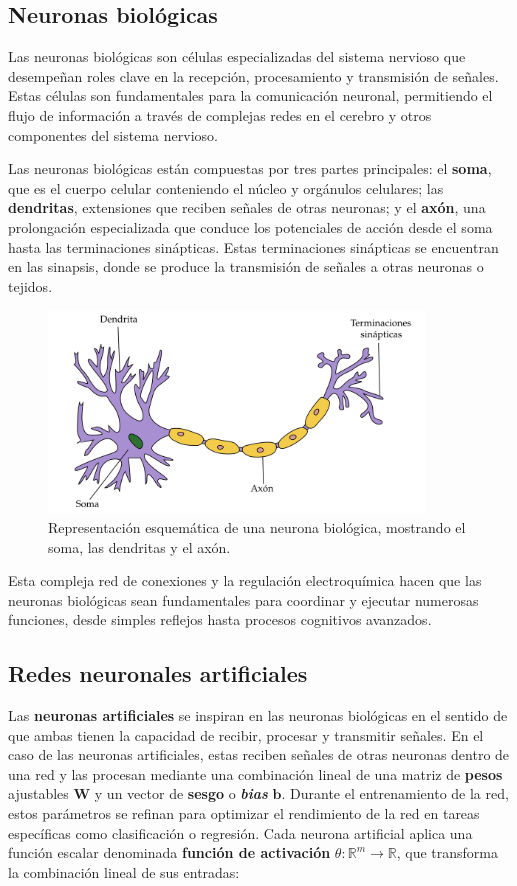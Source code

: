 \subsection{Neuronas biológicas}

Las neuronas biológicas son células especializadas del sistema nervioso que desempeñan roles clave en la recepción, procesamiento y transmisión de señales. Estas células son fundamentales para la comunicación neuronal, permitiendo el flujo de información a través de complejas redes en el cerebro y otros componentes del sistema nervioso.

Las neuronas biológicas están compuestas por tres partes principales: el \textbf{soma}, que es el cuerpo celular conteniendo el núcleo y orgánulos celulares; las \textbf{dendritas}, extensiones que reciben señales de otras neuronas; y el \textbf{axón}, una prolongación especializada que conduce los potenciales de acción desde el soma hasta las terminaciones sinápticas. Estas terminaciones sinápticas se encuentran en las sinapsis, donde se produce la transmisión de señales a otras neuronas o tejidos.

\begin{figure}[H]
	\centering
	\includegraphics[width=100mm,scale=0.5]{img/neuron.png}
	\caption{Representación esquemática de una neurona biológica, mostrando el soma, las dendritas y el axón.}
\end{figure}

Esta compleja red de conexiones y la regulación electroquímica hacen que las neuronas biológicas sean fundamentales para coordinar y ejecutar numerosas funciones, desde simples reflejos hasta procesos cognitivos avanzados.

\subsection{Redes neuronales artificiales}

Las \textbf{neuronas artificiales} se inspiran en las neuronas biológicas en el sentido de que ambas tienen la capacidad de recibir, procesar y transmitir señales. En el caso de las neuronas artificiales, estas reciben señales de otras neuronas dentro de una red y las procesan mediante una combinación lineal de una matriz de \textbf{pesos} ajustables \(\mathbf{W}\) y un vector de \textbf{sesgo} o \textbf{\textit{bias}} \(\mathbf{b}\). Durante el entrenamiento de la red, estos parámetros se refinan para optimizar el rendimiento de la red en tareas específicas como clasificación o regresión. Cada neurona artificial aplica una función escalar denominada \textbf{función de activación} \(\theta: \mathbb{R}^m \to \mathbb{R}\), que transforma la combinación lineal de sus entradas:

